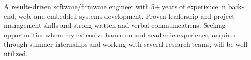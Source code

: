 \cvsummary
{
  A results-driven software/firmware engineer with 5+ years of experience in back-end, web, and embedded systems development. Proven leadership and project management skills and strong written and verbal communications. Seeking opportunities where my extensive hands-on and academic experience, acquired through summer internships and working with several research teams, will be well utilized.
} 